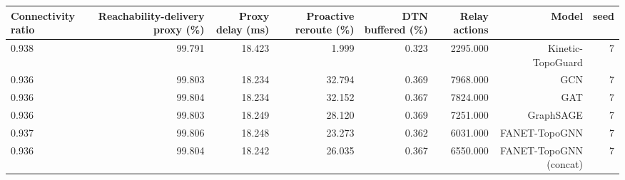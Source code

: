 \begin{tabular}{lrrrrrrr}
\toprule
Connectivity ratio & Reachability-delivery proxy (\%) & Proxy delay (ms) & Proactive reroute (\%) & DTN buffered (\%) & Relay actions & Model & seed \\
\midrule
0.938 & 99.791 & 18.423 & 1.999 & 0.323 & 2295.000 & Kinetic-TopoGuard & 7 \\
0.936 & 99.803 & 18.234 & 32.794 & 0.369 & 7968.000 & GCN & 7 \\
0.936 & 99.804 & 18.234 & 32.152 & 0.367 & 7824.000 & GAT & 7 \\
0.936 & 99.803 & 18.249 & 28.120 & 0.369 & 7251.000 & GraphSAGE & 7 \\
0.937 & 99.806 & 18.248 & 23.273 & 0.362 & 6031.000 & FANET-TopoGNN & 7 \\
0.936 & 99.804 & 18.242 & 26.035 & 0.367 & 6550.000 & FANET-TopoGNN (concat) & 7 \\
\bottomrule
\end{tabular}